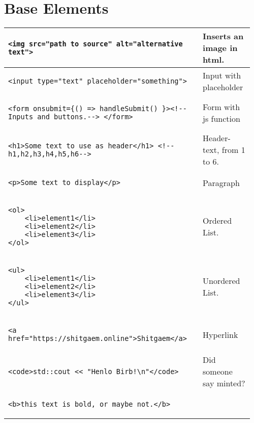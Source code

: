 \documentclass[main.tex,fontsize=8pt,paper=a4,paper=portrait,DIV=calc,]{scrartcl}
\begin{document}
\begin{table}[h!]
\section{Base Elements}
\begin{tabular}{|m{0.755\linewidth}|m{0.2\linewidth}|}
\hline
\begin{lstlisting}
<img src="path to source" alt="alternative text">
\end{lstlisting}
& Inserts an image in html.\\
\hline
\begin{lstlisting}
<input type="text" placeholder="something">
\end{lstlisting}
& Input with placeholder\\
\hline
\begin{lstlisting}
<form onsubmit={() => handleSubmit() }><!--Inputs and buttons.--> </form>
\end{lstlisting}
& Form with js function\\
\hline
\begin{lstlisting}
<h1>Some text to use as header</h1> <!--h1,h2,h3,h4,h5,h6-->
\end{lstlisting}
& Header-text, from 1 to 6.\\
\hline
\begin{lstlisting}
<p>Some text to display</p>
\end{lstlisting}
& Paragraph\\
\hline
\begin{lstlisting}
<ol>
    <li>element1</li>
    <li>element2</li>
    <li>element3</li>
</ol>
\end{lstlisting}
& Ordered List.\\
\hline
\begin{lstlisting}
<ul>
    <li>element1</li>
    <li>element2</li>
    <li>element3</li>
</ul>
\end{lstlisting}
& Unordered List.\\
\hline
\begin{lstlisting}
<a href="https://shitgaem.online">Shitgaem</a>
\end{lstlisting}
& Hyperlink\\
\hline
\begin{lstlisting}
<code>std::cout << "Henlo Birb!\n"</code>
\end{lstlisting}
& Did someone say minted?\\
\hline
\begin{lstlisting}
<b>this text is bold, or maybe not.</b>
\end{lstlisting}

\end{tabular}
\end{table}
\end{document}
